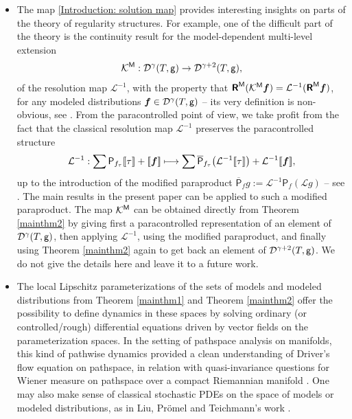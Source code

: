 \documentclass[11pt]{article}
\numberwithin{equation}{section}
\newcommand\mto{\mathchoice{\longmapsto}{\mapsto}{\mapsto}{\mapsto}}
\theoremstyle{plain}
\theoremstyle{definition}
\newcommand{\Brac}[1]{[\![#1]\!]}
\newcommand{\bsf}{\boldsymbol{f}}
\newcommand{\reR}{\boldsymbol{\mathsf{R}}}
\newcommand{\sfP}{\mathsf{P}}
\newcommand{\mcD}{\mathcal{D}}
\newcommand{\mcK}{\mathcal{K}}
\newcommand{\mcL}{\mathcal{L}}
\begin{document}
\begin{itemize}
	\item The map \eqref {Introduction: solution map} provides interesting insights on parts of the theory of regularity structures. For example, one of the difficult part of the theory is the continuity result for the model-dependent multi-level extension
\[
\mcK^{\sf M}: \mcD^\gamma(T,{\sf g}) \to \mcD^{\gamma+2}(T,{\sf g}),
\]
of the resolution map $\mcL^{-1}$, with the property that $\reR^{\sf M}(\mcK^{\sf M}\bsf)=\mcL^{-1}(\reR^{\sf M}\bsf)$, for any modeled distributions $\bsf\in\mcD^\gamma(T,{\sf g})$ -- its very definition is non-obvious, see \cite[\S 5]{Hai}. From the paracontrolled
point of view, we take profit from the fact that the classical resolution map $\mcL^{-1}$ preserves the paracontrolled structure
\[
\mcL^{-1}:\sum \sfP_{f_\tau}\Brac{\tau}+\Brac{\bsf}\mto \sum \overline{\sfP}_{f_\tau}\bigl(\mcL^{-1}\Brac{\tau}\bigr) + \mcL^{-1}\Brac{\bsf},
\]
up to the introduction of the modified paraproduct $\overline{\sfP}_fg := \mcL^{-1}\sfP_f(\mcL g)$ -- see \cite{BB16}. The main results in the present paper can be applied to such a modified paraproduct. The map $\mcK^{\sf M}$ can be obtained directly from Theorem \ref{mainthm2} by giving first a paracontrolled representation of an element of $\mcD^\gamma(T,{\sf g})$, then applying $\mcL^{-1}$, using the modified paraproduct, and finally using Theorem \ref{mainthm2} again to get back an element of $\mcD^{\gamma+2}(T,{\sf g})$. We do not give the details here and leave it to a future work.
	
	\item The local Lipschitz parameterizations of the sets of models and modeled distributions from Theorem \ref{mainthm1} and Theorem \ref{mainthm2} offer the possibility to define dynamics in these spaces by solving ordinary (or controlled/rough) differential equations driven by vector fields on the parameterization spaces. In the setting of pathspace analysis on manifolds, this kind of pathwise dynamics provided a clean understanding of Driver's flow equation on pathspace, in relation with quasi-invariance questions for Wiener measure on pathspace over a compact Riemannian manifold \cite{DriverFlow, LyonsQian, BailleulRegularity}. One may also make sense of classical stochastic PDEs on the space of models or modeled distributions, as in Liu, Prömel and Teichmann's work \cite{LPT18}.
\end{itemize}
\end{document}
